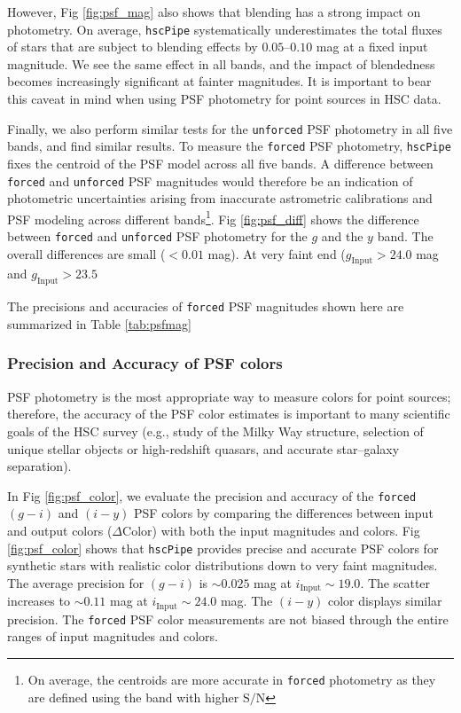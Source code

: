 \documentclass[useamsfonts]{pasj01}
\def\hscpipe{\texttt{hscPipe}}
\def\forced{\texttt{forced}}
\def\unforced{\texttt{unforced}}
\def\s2n{{$\mathrm{S}/\mathrm{N}$}}
\begin{document}
	However, Fig \ref{fig:psf_mag} also shows that blending has a strong impact on 
	photometry.  
	On average, \hscpipe{} systematically underestimates the total fluxes of stars 
	that are subject to blending effects by $0.05$--$0.10$ mag at a fixed input 
	magnitude.
    We see the same effect in all bands, and the impact of blendedness becomes
    increasingly significant at fainter magnitudes.
    It is important to bear this caveat in mind when using PSF photometry for point
    sources in HSC data.

	Finally, we also perform similar tests for the \unforced{} PSF photometry in all 
	five bands, and find similar results. 
	To measure the \forced{} PSF photometry, \hscpipe{} fixes the centroid of the PSF 
	model across all five bands. 
	A difference between \forced{} and \unforced{} PSF magnitudes would therefore be 
	an indication of photometric uncertainties arising from inaccurate astrometric 
	calibrations and PSF modeling across different bands\footnote{On average, the 
	centroids are more accurate in \forced{} photometry as they are defined using 
	the band with higher \s2n{}}. 
	Fig \ref{fig:psf_diff} shows the difference between \forced{} and \unforced{} 
	PSF photometry for the $g$ and the $y$ band. 
	The overall differences are small ($<0.01$ mag). 
	At very faint end ($g_{\mathrm{Input}}>24.0$ mag and $g_{\mathrm{Input}}>23.5$
	
	The precisions and accuracies of \forced{} PSF magnitudes shown here are 
	summarized in Table \ref{tab:psfmag}

\subsubsection{Precision and Accuracy of PSF colors}

    PSF photometry is the most appropriate way to measure colors for point
    sources; therefore, the accuracy of the PSF color estimates is important to many 
    scientific goals of the HSC survey
    (e.g., study of the Milky Way structure, selection of unique stellar objects or
    high-redshift quasars, and accurate star--galaxy separation).

    In Fig \ref{fig:psf_color}, we evaluate the precision and accuracy of the 
    \forced{} $(g-i)$ and $(i-y)$ PSF colors by comparing the differences between input 
    and output colors ($\Delta \mathrm{Color}$) with both the input magnitudes and 
    colors. 
    Fig \ref{fig:psf_color} shows that \hscpipe{} provides precise and accurate PSF 
    colors for synthetic stars with realistic color distributions down to very 
    faint magnitudes. 
    The average precision for $(g-i)$ is ${\sim}0.025$ mag at 
    $i_{\mathrm{Input}}{\sim}19.0$. 
    The scatter increases to ${\sim}0.11$ mag at $i_{\mathrm{Input}}{\sim}24.0$ mag.  
    The $(i-y)$ color displays similar precision. 
    The \forced{} PSF color measurements are not biased through the entire ranges of 
    input magnitudes and colors.
    
\end{document}
